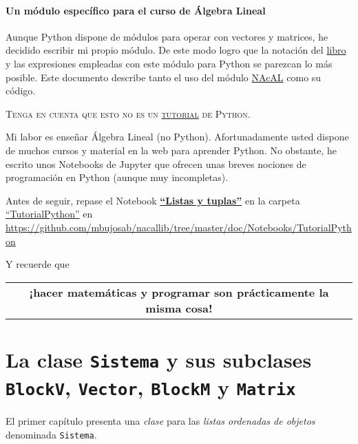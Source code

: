 \documentclass[11pt]{report}
\begin{document}
\subsection*{Un módulo específico para el curso de Álgebra Lineal}
\label{sec:org38fb52a}
Aunque Python dispone de módulos para operar con vectores y matrices, he decidido escribir mi propio
módulo. De este modo logro que la notación del \href{https://github.com/mbujosab/CursoDeAlgebraLineal/blob/master/libro.pdf}{libro} y las expresiones empleadas con este módulo
para Python se parezcan lo más posible. Este documento describe tanto el uso del módulo \href{https://pypi.org/project/nacal/}{NAcAL} como
su código.
\begin{center}
 \textsc{Tenga en cuenta que esto no es un
 \href{https://docs.python.org/es/3/tutorial/index.html}{tutorial} de
 Python}. 
\end{center}
Mi labor es enseñar Álgebra Lineal (no Python). Afortunadamente usted dispone de muchos cursos y
material en la web para aprender Python. No obstante, he escrito unos Notebooks de Jupyter que
ofrecen unas breves nociones de programación en Python (aunque muy incompletas).
\begin{center}
  Antes de seguir, repase el Notebook
  \href{https://mybinder.org/v2/gh/mbujosab/nacallib/master?filepath=doc%2FNotebooks%2FTutorialPython%2F01_ListasYTuplas.ipynb}{\textbf{``Listas y tuplas''}}
    en la carpeta
    \href{https://mybinder.org/v2/gh/mbujosab/nacallib/master?filepath=doc%2FNotebooks%2FTutorialPython%2F}{``TutorialPython''}
    en \url{https://github.com/mbujosab/nacallib/tree/master/doc/Notebooks/TutorialPython}
\end{center}
Y recuerde que 
\begin{center}
\begin{tabular}{c}
\textbf{¡hacer matemáticas y programar son prácticamente la misma cosa!}\\
\end{tabular}
\end{center}


\part{La clase \texttt{Sistema} y sus subclases \texttt{BlockV}, \texttt{Vector}, \texttt{BlockM} y \texttt{Matrix}}
\label{sec:org67b5712}


El primer capítulo presenta una \emph{clase} para las \emph{listas ordenadas de objetos} denominada \texttt{Sistema}.
\end{document}
